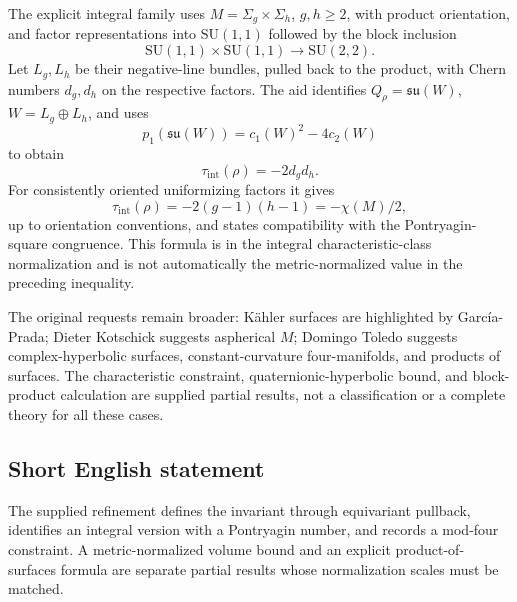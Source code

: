 \documentclass[11pt]{article}
\begin{document}
The explicit integral family uses \(M=\Sigma_g\times\Sigma_h\), \(g,h\geq2\), with product orientation, and factor representations into \(\mathrm{SU}(1,1)\) followed by the block inclusion
\[
 \mathrm{SU}(1,1)\times\mathrm{SU}(1,1)\longrightarrow\mathrm{SU}(2,2).
\]
Let \(L_g,L_h\) be their negative-line bundles, pulled back to the product, with Chern numbers \(d_g,d_h\) on the respective factors. The aid identifies \(Q_\rho=\mathfrak{su}(W)\), \(W=L_g\oplus L_h\), and uses
\[
 p_1(\mathfrak{su}(W))=c_1(W)^2-4c_2(W)
\]
to obtain
\[
 \tau_{\mathrm{int}}(\rho)=-2d_gd_h.
\]
For consistently oriented uniformizing factors it gives
\[
 \tau_{\mathrm{int}}(\rho)=-2(g-1)(h-1)=-\chi(M)/2,
\]
up to orientation conventions, and states compatibility with the Pontryagin-square congruence. This formula is in the integral characteristic-class normalization and is not automatically the metric-normalized value in the preceding inequality.

The original requests remain broader: K\"ahler surfaces are highlighted by Garc\'ia-Prada; Dieter Kotschick suggests aspherical \(M\); Domingo Toledo suggests complex-hyperbolic surfaces, constant-curvature four-manifolds, and products of surfaces. The characteristic constraint, quaternionic-hyperbolic bound, and block-product calculation are supplied partial results, not a classification or a complete theory for all these cases.
\subsection{Short English statement}
The supplied refinement defines the invariant through equivariant pullback, identifies an integral version with a Pontryagin number, and records a mod-four constraint. A metric-normalized volume bound and an explicit product-of-surfaces formula are separate partial results whose normalization scales must be matched.
\end{document}
